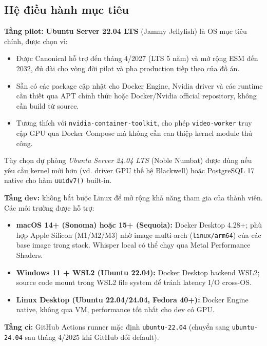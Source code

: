 \subsection{Hệ điều hành mục tiêu}

\textbf{Tầng pilot:} \textbf{Ubuntu Server 22.04 LTS} (Jammy Jellyfish)
là OS mục tiêu chính, được chọn vì:

\begin{itemize}
    \item Được Canonical hỗ trợ đến tháng 4/2027 (LTS 5 năm) và mở rộng
          ESM đến 2032, đủ dài cho vòng đời pilot và pha production
          tiếp theo của đồ án.
    \item Sẵn có các package cập nhật cho Docker Engine, Nvidia driver
          và các runtime cần thiết qua APT chính thức hoặc Docker/Nvidia
          official repository, không cần build từ source.
    \item Tương thích với \texttt{nvidia-container-toolkit}, cho phép
          \texttt{video-worker} truy cập GPU qua Docker Compose mà
          không cần can thiệp kernel module thủ công.
\end{itemize}

Tùy chọn dự phòng \textit{Ubuntu Server 24.04 LTS} (Noble Numbat) được
dùng nếu yêu cầu kernel mới hơn (vd. driver GPU thế hệ Blackwell) hoặc
PostgreSQL 17 native cho hàm \texttt{uuidv7()} built-in.

\textbf{Tầng dev:} không bắt buộc Linux để mở rộng khả năng tham gia
của thành viên. Các môi trường được hỗ trợ:

\begin{itemize}
    \item \textbf{macOS 14+ (Sonoma) hoặc 15+ (Sequoia):} Docker
          Desktop 4.28+; phù hợp Apple Silicon (M1/M2/M3) nhờ image
          multi-arch (\texttt{linux/arm64}) của các base image trong
          stack. Whisper local có thể chạy qua Metal Performance Shaders.
    \item \textbf{Windows 11 + WSL2 (Ubuntu 22.04):} Docker Desktop
          backend WSL2; source code mount trong WSL2 file system để
          tránh latency I/O cross-OS.
    \item \textbf{Linux Desktop (Ubuntu 22.04/24.04, Fedora 40+):}
          Docker Engine native, không qua VM, performance tốt nhất cho
          dev có GPU.
\end{itemize}

\textbf{Tầng ci:} GitHub Actions runner mặc định
\texttt{ubuntu-22.04} (chuyển sang \texttt{ubuntu-24.04} sau tháng
4/2025 khi GitHub đổi default).

